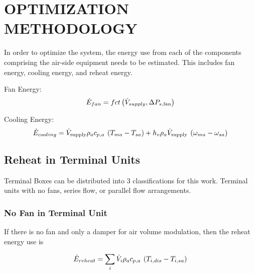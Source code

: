 %
%
%



\chapter{\uppercase{Optimization Methodology}}

In order to optimize the system, the energy use from each of the components comprising the air-side equipment needs to be estimated. This includes fan energy, cooling energy, and reheat energy.


Fan Energy:
\begin{equation} \label{eq:FanEqnergy} 
\dot E_{fan} = fct\left( {\dot{V}_{supply},\Delta {P_{s,{\rm{fan}}}}} \right)
\end{equation}

Cooling Energy:
\begin{equation} \label{eq:CoolingEnergy}
    {\dot E_{cooling}} = {\dot{V}_{\text{supply}}}\rho_a c_{p,a}\:\left( {{T_{ma}} - {T_{sa}}} \right) + h_v\rho_a{\dot{V}_{\text{supply}}}\:\left( {{\omega _{ma}} - {\omega _{sa}}} \right)
\end{equation}

\section{Reheat in Terminal Units}

Terminal Boxes can be distributed into 3 classifications for this work. Terminal units with no fans, series flow, or parallel flow arrangements.

\subsection{No Fan in Terminal Unit}

If there is no fan and only a damper for air volume modulation, then the reheat energy use is 

\begin{equation} \label{eq:ReheatEnergy}
    {\dot E_{reheat}} = \sum\limits_i {{\dot{V}_{i}}\rho_a c_{p,a}\:\left( {{T_{i,dis}} - {T_{i,sa}}} \right)} 
\end{equation}

